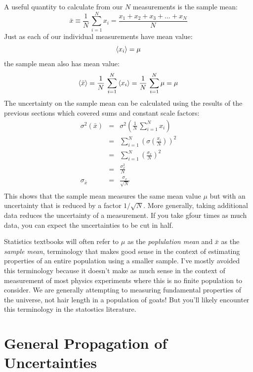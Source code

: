 \documentclass[12pt,oneside]{book}
\begin{document}
A useful quantity to calculate from our $N$ measurements is the sample mean:
\begin{displaymath}
  \bar{x} \equiv \frac{1}{N} \, \sum_{i=1}^{N} x_i = \frac{x_1 + x_2 + x_3 + \ldots + x_N}{N}
\end{displaymath}
Just as each of our individual measurements have mean value:
\begin{displaymath}
\braket{x_i} = \mu  
\end{displaymath}
the sample mean also has mean value:
\begin{displaymath}
  \braket{\bar{x}} = \frac{1}{N} \, \sum_{i=1}^{N} \braket{x_i}
= \frac{1}{N} \, \sum_{i=1}^{N} \mu = \mu
\end{displaymath}
The uncertainty on the sample mean can be calculated using the results of the previous sections which covered sums and constant scale factors:
\begin{eqnarray*}
  \sigma^2(\bar{x}) &=& \sigma^2\left( \frac{1}{N} \, \sum_{i=1}^{N} x_i \right) \\
  &=& \sum_{i=1}^{N} \left( \sigma \left( \frac{x_i}{N} \right) \right)^2 \\
  &=& \sum_{i=1}^{N} \left( \frac{\sigma_x}{N} \right)^2 \\ 
  &=& \frac{\sigma_x^2}{N} \\
 \sigma_{\bar{x}} &=& \frac{\sigma_x}{\sqrt{N}} \\
\end{eqnarray*}
This shows that the sample mean measures the same mean value $\mu$ but
with an uncertainty that is reduced by a factor $1/\sqrt{N}$.  More
generally, taking additional data reduces the uncertainty of a
measurement.  If you take gfour times as much data, you can expect the
uncertainties to be cut in half.

Statistics textbooks will often refer to $\mu$ as the {\em poplulation
  mean} and $\bar{x}$ as the {\em sample mean}, terminology that makes
good sense in the context of estimating properties of an entire
population using a smaller sample.  I've mostly avoided this
terminology because it doesn't make as much sense in the context of
measurement of most physics experiments where this is no finite
population to consider.  We are generally attempting to measuring
fundamental properties of the universe, not hair length in a
population of goats!  But you'll likely encounter this terminology in
the statostics literature.

\section{General Propagation of Uncertainties}
\end{document}

